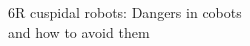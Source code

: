 \documentclass[preview]{standalone}
\begin{document}
\begin{center}
6R cuspidal robots: Dangers in cobots \\ and how to avoid them
\end{center}
\end{document}
